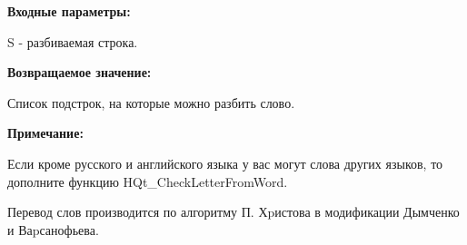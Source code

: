 \textbf{Входные параметры:}

S - разбиваемая строка.

\textbf{Возвращаемое значение:}
 
Список подстрок, на которые можно разбить слово.

\textbf{Примечание:}

     Если кроме русского и английского языка у вас могут слова других языков, то дополните функцию HQt\_CheckLetterFromWord.
	 
	 Перевод слов производится по алгоритму П. Хpистова в модификации Дымченко и Ваpсанофьева.